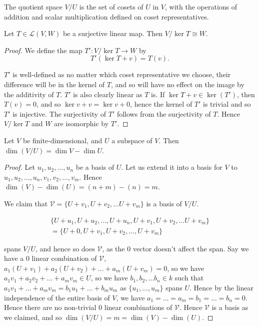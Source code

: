 \documentclass[]{article}
\begin{document}
		\begin{defi} 
				The quotient space $V / U$ is the set of cosets of $U$ in $V$, with the operations of addition and scalar multiplication defined on coset representatives.
		\end{defi}

\begin{thm} 
		Let $T \in \mathcal{L}(V,W)$ be a surjective linear map. Then $V / \ker T \cong W$.
\end{thm}

\begin{proof}
		We define the map $T': V / \ker T \to W$ by
		\[
				T'(\ker T + v) = T(v)
		.\] 

		$T'$ is well-defined as no matter which coset representative we choose, their difference will be in the kernel of $T$, and so will have no effect on the image by the additivity of $T$. $T'$ is also clearly linear as $T$ is. If $\ker T + v \in \ker (T')$, then $T(v) = 0$, and so $\ker v + v = \ker v + 0$, hence the kernel of $T'$ is trivial and so $T'$ is injective. The surjectivity of $T'$ follows from the surjectivity of $T$. Hence $V / \ker T$ and $W$ are isomorphic by $T'$.
\end{proof}

\begin{thm}
		Let $V$ be finite-dimensional, and $U$ a subspace of $V$. Then $\dim (V / U) = \dim V - \dim U$.
\end{thm}

\begin{proof}
		Let $u_1, u_2, \ldots, u_n$ be a basis of $U$. Let us extend it into a basis for $V$ to $u_1, u_2, \ldots, u_n, v_1, v_2, \ldots, v_m$.	Hence $\dim(V) - \dim(U) = (n + m) - (n) = m$. 

		We claim that $\mathcal{V} = \{U + v_1, U + v_2, \ldots U + v_m\}$ is a basis of $V / U$. 

		\begin{align*}
			\{U + u_1, U + u_2, \ldots, U + u_n, U + v_1, U + v_2, \ldots U + v_m\} \\
			= \{U + 0, U + v_1, U + v_2, \ldots, U + v_m\}	
		\end{align*}

		spans $V / U$, and hence so does $\mathcal{V}$, as the $0$ vector doesn't affect the span. Say we have a $0$ linear combination of $\mathcal{V}$, $a_1 (U + v_1) + a_2 (U + v_2) + \ldots + a_m (U + v_m) = 0$, so we have $a_1 v_1 + a_2 v_2 + \ldots + a_m v_m \in U$, so we have $b_1, b_2, \ldots b_n \in k$ such that $a_1 v_1 + \ldots + a_m v_m = b_1 u_1 + \ldots + b_m u_m$ as $\{u_1, \ldots, u_m\}$ spans $U$. Hence by the linear independence of the entire basis of $V$, we have $a_1 = \ldots = a_m = b_1 = \ldots = b_n = 0$. Hence there are no non-trivial $0$ linear combinations of $\mathcal{V}$. Hence $\mathcal{V}$ is a basis as we claimed, and so $\dim (V / U) = m = \dim(V) - \dim(U)$.
\end{proof}
\end{document}
